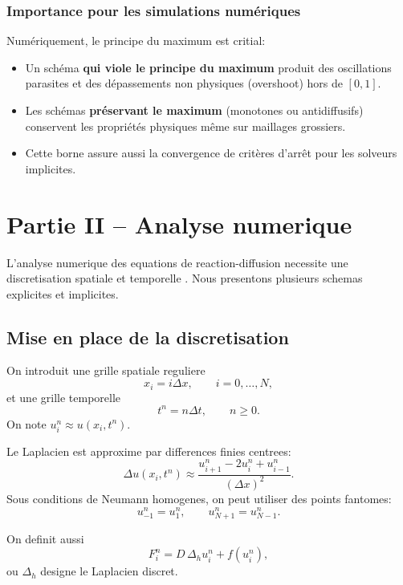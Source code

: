 \documentclass[11pt,a4paper]{report}
\begin{document}
\subsection*{Importance pour les simulations numériques}
Numériquement, le principe du maximum est critial:
\begin{itemize}[leftmargin=1.5em]
  \item Un schéma \textbf{qui viole le principe du maximum} produit des oscillations parasites
        et des dépassements non physiques (overshoot) hors de $[0,1]$.
  \item Les schémas \textbf{préservant le maximum} (monotones ou antidiffusifs) conservent
        les propriétés physiques même sur maillages grossiers.
  \item Cette borne assure aussi la convergence de critères d'arrêt pour les solveurs implicites.
\end{itemize}

\chapter{Partie II -- Analyse numerique}
L'analyse numerique des equations de reaction-diffusion necessite une discretisation spatiale
et temporelle \cite{Strikwerda2004,LeVeque2007}. Nous presentons plusieurs schemas explicites
et implicites.

\section{Mise en place de la discretisation}
On introduit une grille spatiale reguliere
\begin{equation}
 x_i=i\Delta x, \qquad i=0,\ldots,N,
\end{equation}
et une grille temporelle
\begin{equation}
 t^n=n\Delta t, \qquad n\ge 0.
\end{equation}
On note $u_i^n \approx u(x_i,t^n)$.

Le Laplacien est approxime par differences finies centrees:
\begin{equation}
 \Delta u(x_i,t^n) \approx \frac{u_{i+1}^n-2u_i^n+u_{i-1}^n}{(\Delta x)^2}.
\end{equation}
Sous conditions de Neumann homogenes, on peut utiliser des points fantomes:
\begin{equation}
 u_{-1}^n=u_1^n, \qquad u_{N+1}^n=u_{N-1}^n.
\end{equation}

On definit aussi
\begin{equation}
 F_i^n = D\,\Delta_h u_i^n + f(u_i^n),
\end{equation}
ou $\Delta_h$ designe le Laplacien discret.
\end{document}
